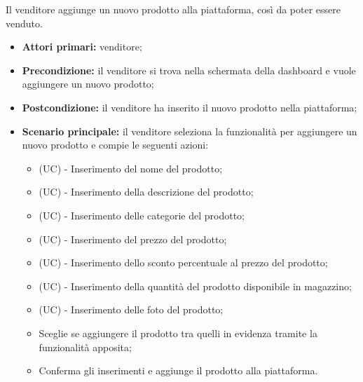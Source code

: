 
Il venditore aggiunge un nuovo prodotto alla piattaforma, così da poter essere venduto.
\begin{itemize}
    \item \textbf{Attori primari:} venditore;
    \item \textbf{Precondizione:} il venditore si trova nella schermata della dashboard e vuole aggiungere un nuovo prodotto;
    \item \textbf{Postcondizione:} il venditore ha inserito il nuovo prodotto nella piattaforma;
    \item \textbf{Scenario principale:} il venditore seleziona la funzionalità per aggiungere un nuovo prodotto e compie le seguenti azioni:
    \begin{itemize}
        \item (UC) - Inserimento del nome del prodotto;
        \item (UC) - Inserimento della descrizione del prodotto;
        \item (UC) - Inserimento delle categorie del prodotto;
        \item (UC) - Inserimento del prezzo del prodotto;
        \item (UC) - Inserimento dello sconto percentuale al prezzo del prodotto;
        \item (UC) - Inserimento della quantità del prodotto disponibile in magazzino;
        \item (UC) - Inserimento delle foto del prodotto;
        \item Sceglie se aggiungere il prodotto tra quelli in evidenza tramite la funzionalità apposita;
        \item Conferma gli inserimenti e aggiunge il prodotto alla piattaforma.
    \end{itemize}
\end{itemize}

